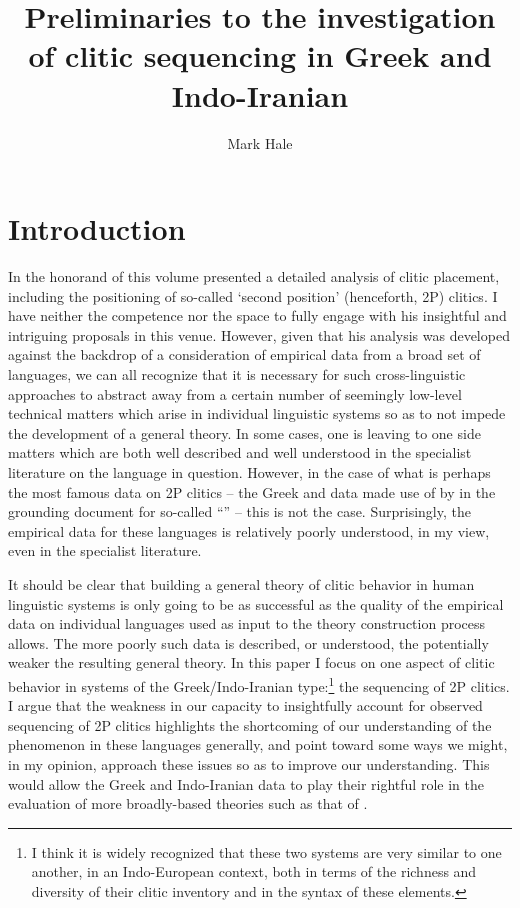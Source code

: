 \documentclass[output=paper,
modfonts
]{LSP/langsci}
\title{Preliminaries to the investigation of clitic sequencing in Greek and Indo-Iranian}
\author{%
 Mark Hale\affiliation{Concordia University, Montréal}
}
\begin{document}
\maketitle



\section{Introduction}
In \citet{anderson2005} the honorand of this volume presented a detailed analysis
of clitic placement, including the positioning of so-called `second position'
(henceforth, 2P) clitics. I have neither the competence nor the space to
fully engage with his insightful and intriguing proposals in this venue.
However, given that his analysis was developed against the backdrop of a
consideration of empirical data from a broad set of languages, we can
all recognize that it is necessary for such cross-linguistic approaches to abstract away
from a certain number of seemingly low-level technical matters which
arise in individual linguistic systems so as to not impede the development
of a general theory. In some cases, one is leaving to one side matters
which are both well described and well understood in the specialist literature
on the language in question. However, in the case of what is perhaps
the most famous data on 2P clitics -- the Greek and  data made use of 
by \citet{wackernagel1892} in the grounding document for so-called ``'' -- this 
is not the case. Surprisingly, the empirical data for these languages is relatively
poorly understood, in my view, even in the specialist literature. 

It should be clear that building a general theory of clitic behavior in human
linguistic systems is only going to be as successful as the quality of the empirical data
on individual languages used as input to the theory construction process allows.
The more poorly such data is described, or understood, the potentially weaker the resulting
general theory. In this paper I focus on one aspect of clitic behavior in
systems of the Greek/Indo-Iranian type:\footnote{I think it is widely recognized that these
two systems are very similar to one another, in an Indo-European context, both in terms
of the richness and diversity of their clitic inventory and in the syntax of these
elements.} the sequencing of 2P clitics. I argue that the weakness in our capacity
to insightfully account for observed sequencing of 2P clitics highlights the
shortcoming of our understanding of the phenomenon in these languages generally,
and point toward some ways we might, in my opinion, approach these issues so as
to improve our understanding. This would allow the Greek and Indo-Iranian data to
play their rightful role in the evaluation of more broadly-based theories such as
that of \citet{anderson2005}.
\end{document}
